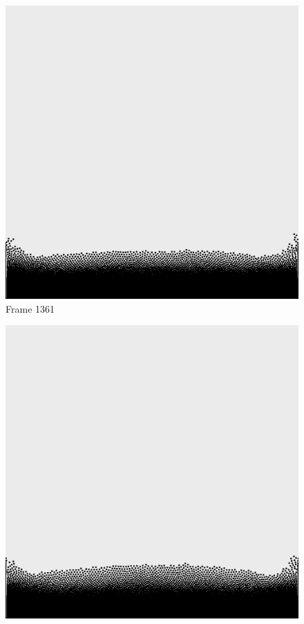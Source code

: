 \documentclass[a4paper, 12pt, oneside]{book}
\begin{document}
\begin{figure}[!ht]
    \addvspace{0.5ex}
        \begin{center}
            \includegraphics[width=\linewidth]{images/test_case_1/1361.png}
            Frame 1361
        \end{center}
    \endminipage
    \hfill
        \begin{center}
            \includegraphics[width=\linewidth]{images/test_case_1/1381.png}

\end{center}
\end{figure}
\end{document}
